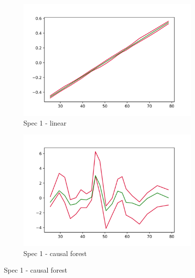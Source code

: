 \begin{figure}[h]
    \centering
    \begin{subfigure}{0.5\linewidth}
        \includegraphics[width=\linewidth]{figures/ALE/chTOTexp/spec1_linear_AGE.png}
        \caption{Spec 1 - linear}
    \end{subfigure}%
    \begin{subfigure}{0.5\linewidth}
        \includegraphics[width=\linewidth]{figures/ALE/chTOTexp/spec1_cf_AGE.png}
        \caption{Spec 1 - causal forest}
    \end{subfigure}


\end{figure}
